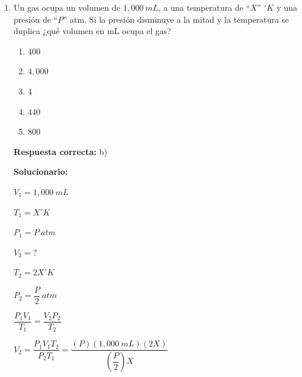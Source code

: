 \begin{enumerate}[resume]
	\begin{enumerate}[label=\alph*)]
		\item I y IV
		\item II y V
		\item Solo III
		\item IV y II
		\item Solo V
	\end{enumerate}
	\textbf{Respuesta correcta:} c)
	
	\vspace{2mm}
	\textbf{Solucionario:}
	
	$(\mathrm{Cl^{+7}O_4^{2-}})^{1-}$ \quad perclorato \quad ok
	
	$(\mathrm{P^{+5}O_3^{2-}})^{1-}$ \quad fosfato \quad ok
	
	$(\mathrm{C^{+4}O_2^{2-}})$ \quad carbonato \quad no
	
	$\mathrm{Cl^{1-}}$ \qquad cloruro \quad ok
	
	$(\mathrm{H^{+1}S^{+6}O_4^{2-}})^{1-}$ \quad bisulfato \quad ok

	
	\vspace{6mm}
	
	\item Un gas ocupa un volumen de $1,000\ mL$, a una temperatura de ``$X$'' $^\circ K$ y una presión de ``$P$'' atm. Si la presión disminuye a la mitad y la temperatura se duplica ¿qué volumen en mL ocupa el gas?
	\begin{enumerate}[label=\alph*)]
		\item $400$
		\item $4,000$
		\item $4$
		\item $440$
		\item $800$
	\end{enumerate}
	\textbf{Respuesta correcta:} b)
	
	\vspace{2mm}
	\textbf{Solucionario:}
	
	$V_1=1,000\ mL$
	
	$T_1=X^\circ K$
	
	$P_1=P\ atm$
	
	$V_2=?$
	
	$T_2=2X^\circ K$
	
	$P_2=\dfrac{P}{2}\ atm$
	
	$\dfrac{P_1V_1}{T_1}=\dfrac{V_2P_2}{T_2}$
	
	$V_2=\dfrac{P_1V_1T_2}{P_2T_1}=\dfrac{(P)(1,000\ mL)(2X)}{\left(\dfrac{P}{2}\right)X}$
	

\end{enumerate}
